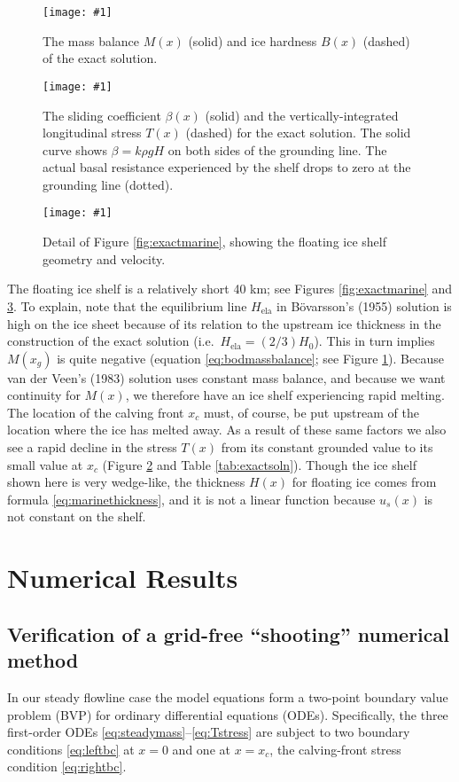 \documentclass[review,letterpaper]{igs}
\renewcommand{\dh}{\fontencoding{T1}\selectfont{\symbol{240}}}
\newcommand{\onecol}[1]{\texttt{[image: \#1]}}
\newcommand{\bod}{B\"o\dh varsson\xspace}
\newcommand{\Hela}{H_{\text{ela}}}
\begin{document}
\begin{figure}[ht]
\onecol{em-M-B}
\caption{The mass balance $M(x)$ (solid) and ice hardness $B(x)$ (dashed) of the exact solution.} \label{fig:exactMB}
\end{figure}

\begin{figure}[ht]
\onecol{em-beta-T}
\caption{The sliding coefficient $\beta(x)$ (solid) and the vertically-integrated longitudinal stress $T(x)$ (dashed) for the exact solution.  The solid curve shows $\beta = k \rho g H$ on both sides of the grounding line.  The actual basal resistance experienced by the shelf drops to zero at the grounding line (dotted).} \label{fig:exactbetaT}
\end{figure}

\begin{figure}[ht]
\onecol{em-geometry-detail}
\caption{Detail of Figure \ref{fig:exactmarine}, showing the floating ice shelf geometry and velocity.} \label{fig:em-detail}
\end{figure}

The floating ice shelf is a relatively short 40 km; see Figures \ref{fig:exactmarine} and \ref{fig:em-detail}.  To explain, note that the equilibrium line $\Hela$ in \bod's (1955) solution is high on the ice sheet because of its relation to the upstream ice thickness in the construction of the exact solution (i.e.~$\Hela = (2/3) H_0$).  This in turn implies $M(x_g)$ is quite negative (equation \eqref{eq:bodmassbalance}; see Figure \ref{fig:exactMB}).  Because van der Veen's (1983) solution uses constant mass balance, and because we want continuity for $M(x)$, we therefore have an ice shelf experiencing rapid melting.  The location of the calving front $x_c$ must, of course, be put upstream of the location where the ice has melted away.  As a result of these same factors we also see a rapid decline in the stress $T(x)$ from its constant grounded value to its small value at $x_c$ (Figure \ref{fig:exactbetaT} and Table \ref{tab:exactsoln}).  Though the ice shelf shown here is very wedge-like, the thickness $H(x)$ for floating ice comes from formula \eqref{eq:marinethickness}, and it is not a linear function because $u_s(x)$ is not constant on the shelf.


\section{Numerical Results}

\subsection*{Verification of a grid-free ``shooting'' numerical method}  In our steady flowline case the model equations form a two-point boundary value problem (BVP) for ordinary differential equations (ODEs).  Specifically, the three first-order ODEs \eqref{eq:steadymass}--\eqref{eq:Tstress} are subject to two boundary conditions \eqref{eq:leftbc} at $x=0$ and one at $x=x_c$, the calving-front stress condition \eqref{eq:rightbc}.  
\end{document}
